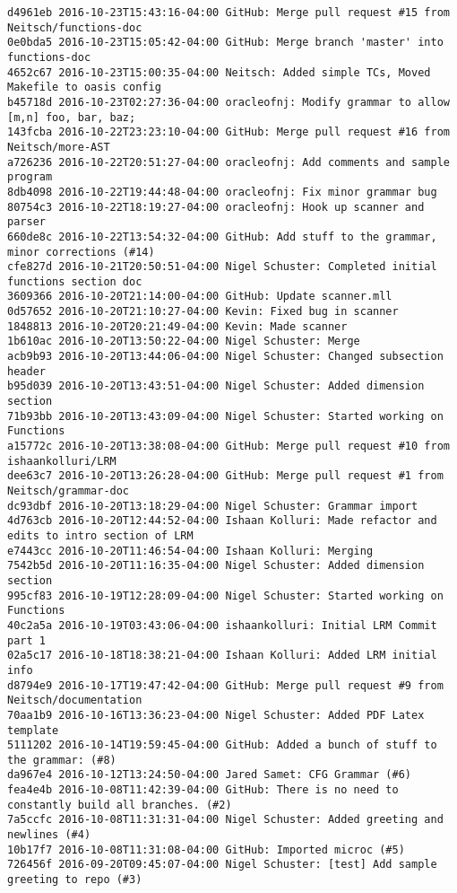 \begin{lstlisting}
d4961eb 2016-10-23T15:43:16-04:00 GitHub: Merge pull request #15 from Neitsch/functions-doc
0e0bda5 2016-10-23T15:05:42-04:00 GitHub: Merge branch 'master' into functions-doc
4652c67 2016-10-23T15:00:35-04:00 Neitsch: Added simple TCs, Moved Makefile to oasis config
b45718d 2016-10-23T02:27:36-04:00 oracleofnj: Modify grammar to allow [m,n] foo, bar, baz;
143fcba 2016-10-22T23:23:10-04:00 GitHub: Merge pull request #16 from Neitsch/more-AST
a726236 2016-10-22T20:51:27-04:00 oracleofnj: Add comments and sample program
8db4098 2016-10-22T19:44:48-04:00 oracleofnj: Fix minor grammar bug
80754c3 2016-10-22T18:19:27-04:00 oracleofnj: Hook up scanner and parser
660de8c 2016-10-22T13:54:32-04:00 GitHub: Add stuff to the grammar, minor corrections (#14)
cfe827d 2016-10-21T20:50:51-04:00 Nigel Schuster: Completed initial functions section doc
3609366 2016-10-20T21:14:00-04:00 GitHub: Update scanner.mll
0d57652 2016-10-20T21:10:27-04:00 Kevin: Fixed bug in scanner
1848813 2016-10-20T20:21:49-04:00 Kevin: Made scanner
1b610ac 2016-10-20T13:50:22-04:00 Nigel Schuster: Merge
acb9b93 2016-10-20T13:44:06-04:00 Nigel Schuster: Changed subsection header
b95d039 2016-10-20T13:43:51-04:00 Nigel Schuster: Added dimension section
71b93bb 2016-10-20T13:43:09-04:00 Nigel Schuster: Started working on Functions
a15772c 2016-10-20T13:38:08-04:00 GitHub: Merge pull request #10 from ishaankolluri/LRM
dee63c7 2016-10-20T13:26:28-04:00 GitHub: Merge pull request #1 from Neitsch/grammar-doc
dc93dbf 2016-10-20T13:18:29-04:00 Nigel Schuster: Grammar import
4d763cb 2016-10-20T12:44:52-04:00 Ishaan Kolluri: Made refactor and edits to intro section of LRM
e7443cc 2016-10-20T11:46:54-04:00 Ishaan Kolluri: Merging
7542b5d 2016-10-20T11:16:35-04:00 Nigel Schuster: Added dimension section
995cf83 2016-10-19T12:28:09-04:00 Nigel Schuster: Started working on Functions
40c2a5a 2016-10-19T03:43:06-04:00 ishaankolluri: Initial LRM Commit part 1
02a5c17 2016-10-18T18:38:21-04:00 Ishaan Kolluri: Added LRM initial info
d8794e9 2016-10-17T19:47:42-04:00 GitHub: Merge pull request #9 from Neitsch/documentation
70aa1b9 2016-10-16T13:36:23-04:00 Nigel Schuster: Added PDF Latex template
5111202 2016-10-14T19:59:45-04:00 GitHub: Added a bunch of stuff to the grammar: (#8)
da967e4 2016-10-12T13:24:50-04:00 Jared Samet: CFG Grammar (#6)
fea4e4b 2016-10-08T11:42:39-04:00 GitHub: There is no need to constantly build all branches. (#2)
7a5ccfc 2016-10-08T11:31:31-04:00 Nigel Schuster: Added greeting and newlines (#4)
10b17f7 2016-10-08T11:31:08-04:00 GitHub: Imported microc (#5)
726456f 2016-09-20T09:45:07-04:00 Nigel Schuster: [test] Add sample greeting to repo (#3)

\end{lstlisting}
